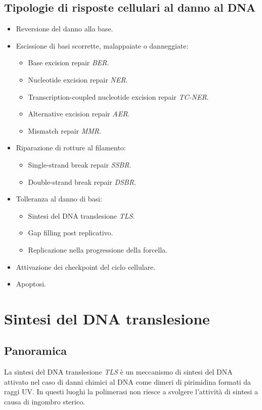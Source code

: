 	\subsection{Tipologie di risposte cellulari al danno al DNA}
	\begin{multicols}{2}
		\begin{itemize}
			\item Reversione del danno alla base.
			\item Escissione di basi scorrette, malappaiate o danneggiate:
				\begin{itemize}
					\item Base excision repair \emph{BER}.
					\item Nucleotide excision repair \emph{NER}.
					\item Transcription-coupled nucleotide excision repair \emph{TC-NER}.
					\item Alternative excision repair \emph{AER}.
					\item Mismatch repair \emph{MMR}.
				\end{itemize}
			\item Riparazione di rotture al filamento:
				\begin{itemize}
					\item Single-strand break repair \emph{SSBR}.
					\item Double-strand break repair \emph{DSBR}.
				\end{itemize}
			\item Tolleranza al danno di basi:
				\begin{itemize}
					\item Sintesi del DNA translesione \emph{TLS}.
					\item Gap filling post replicativo.
					\item Replicazione nella progressione della forcella.
				\end{itemize}
			\item Attivazione dei checkpoint del ciclo cellulare.
			\item Apoptosi.
		\end{itemize}
	\end{multicols}

\section{Sintesi del DNA translesione}

	\subsection{Panoramica}
	La sintesi del DNA translesione \emph{TLS} \`e un meccanismo di sintesi del DNA attivato nel caso di danni chimici al DNA come dimeri di pirimidina formati da raggi UV.
	In questi luoghi la polimerasi non riesce a svolgere l'attivit\`a di sintesi a causa di ingombro sterico.

